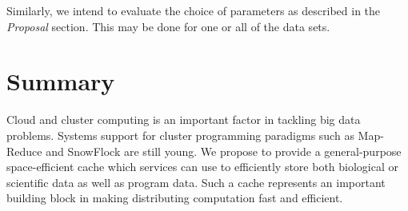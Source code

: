\documentclass{article}[12pt]
\begin{document}
Similarly, we intend to evaluate the choice of parameters as described in the
{\em Proposal} section.  This may be done for one or all of the data sets.

\section*{Summary}

Cloud and cluster computing is an important factor in tackling big data
problems.  Systems support for cluster programming paradigms such as Map-Reduce
and SnowFlock are still young.  We propose to provide a general-purpose
space-efficient cache which services can use to efficiently store both
biological or scientific data as well as program data.  Such a cache represents
an important building block in making distributing computation fast and
efficient.

\newpage


\end{document}
